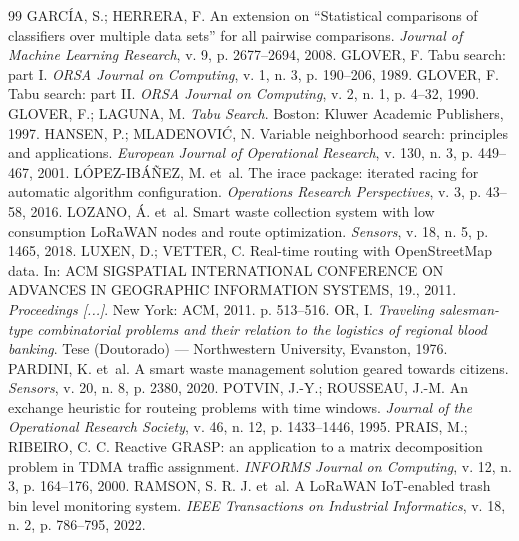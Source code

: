 \documentclass[12pt, a4paper]{article}
\begin{document}
\begin{thebibliography}{99}
 GARCÍA, S.; HERRERA, F. An extension on ``Statistical comparisons of classifiers over multiple data sets'' for all pairwise comparisons. \textit{Journal of Machine Learning Research}, v. 9, p. 2677--2694, 2008.
 GLOVER, F. Tabu search: part I. \textit{ORSA Journal on Computing}, v. 1, n. 3, p. 190--206, 1989.
 GLOVER, F. Tabu search: part II. \textit{ORSA Journal on Computing}, v. 2, n. 1, p. 4--32, 1990.
 GLOVER, F.; LAGUNA, M. \textit{Tabu Search}. Boston: Kluwer Academic Publishers, 1997.
 HANSEN, P.; MLADENOVI\'C, N. Variable neighborhood search: principles and applications. \textit{European Journal of Operational Research}, v. 130, n. 3, p. 449--467, 2001.
 L\'OPEZ-IB\'A\~NEZ, M. et~al. The irace package: iterated racing for automatic algorithm configuration. \textit{Operations Research Perspectives}, v. 3, p. 43--58, 2016.
 LOZANO, \'A. et~al. Smart waste collection system with low consumption LoRaWAN nodes and route optimization. \textit{Sensors}, v. 18, n. 5, p. 1465, 2018.
 LUXEN, D.; VETTER, C. Real-time routing with OpenStreetMap data. In: ACM SIGSPATIAL INTERNATIONAL CONFERENCE ON ADVANCES IN GEOGRAPHIC INFORMATION SYSTEMS, 19., 2011. \textit{Proceedings [...]}. New York: ACM, 2011. p. 513--516.
 OR, I. \textit{Traveling salesman-type combinatorial problems and their relation to the logistics of regional blood banking}. Tese (Doutorado) --- Northwestern University, Evanston, 1976.
 PARDINI, K. et~al. A smart waste management solution geared towards citizens. \textit{Sensors}, v. 20, n. 8, p. 2380, 2020.
 POTVIN, J.-Y.; ROUSSEAU, J.-M. An exchange heuristic for routeing problems with time windows. \textit{Journal of the Operational Research Society}, v. 46, n. 12, p. 1433--1446, 1995.
 PRAIS, M.; RIBEIRO, C. C. Reactive GRASP: an application to a matrix decomposition problem in TDMA traffic assignment. \textit{INFORMS Journal on Computing}, v. 12, n. 3, p. 164--176, 2000.
 RAMSON, S. R. J. et~al. A LoRaWAN IoT-enabled trash bin level monitoring system. \textit{IEEE Transactions on Industrial Informatics}, v. 18, n. 2, p. 786--795, 2022.

\end{thebibliography}
\end{document}
